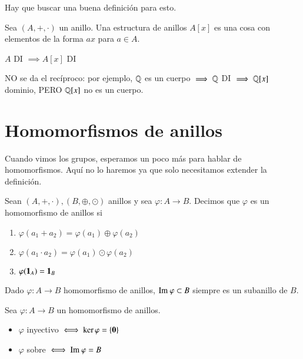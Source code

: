 Hay que buscar una buena definición para esto.
\begin{dfn}
	Sea $(A, +, \cdot)$ un anillo. Una estructura de anillos $A[x]$ es una cosa con elementos de la forma $ax$ para $a \in A$.
\end{dfn}

\begin{pro}
	$A$ DI $\implies A[x]$ DI
\end{pro}

\begin{obs}
	NO se da el recíproco: por ejemplo, $\mathbb{Q}$ es un cuerpo $\implies \mathbb{Q}$ DI $\implies \mathbb{Q}[x]$ dominio, PERO $\mathbb{Q}[x]$ no es un cuerpo.
\end{obs}

\section{Homomorfismos de anillos}

Cuando vimos los grupos, esperamos un poco más para hablar de homomorfismos. Aquí no lo haremos ya que solo necesitamos extender la definición.

\begin{dfn}
	Sean $(A, +, \cdot), (B, \oplus, \odot)$ anillos y sea $\varphi: A \to B$. Decimos que $\varphi$ es un homomorfismo de anillos si
	\begin{enumerate}
		\item $\varphi(a_1+a_2) = \varphi(a_1) \oplus \varphi(a_2)$
		\item $\varphi(a_1 \cdot a_2) = \varphi(a_1)\odot\varphi(a_2)$
		\item $\varphi(\mathbf{1}_A) = \mathbf{1}_B$
	\end{enumerate}
\end{dfn}

\begin{obs}
	Dado $\varphi:A \to B$ homomorfismo de anillos, $\text{Im } \varphi \subset B$ siempre es un subanillo de $B$.
\end{obs}

\begin{pro}
	Sea $\varphi: A \to B$ un homomorfismo de anillos.
	\begin{itemize}
		\item $\varphi$ inyectivo $\iff \ker \varphi = \{\mathbf{0}\}$
		\item $\varphi$ sobre $\iff \text{Im } \varphi = B$
	\end{itemize}
\end{pro}

